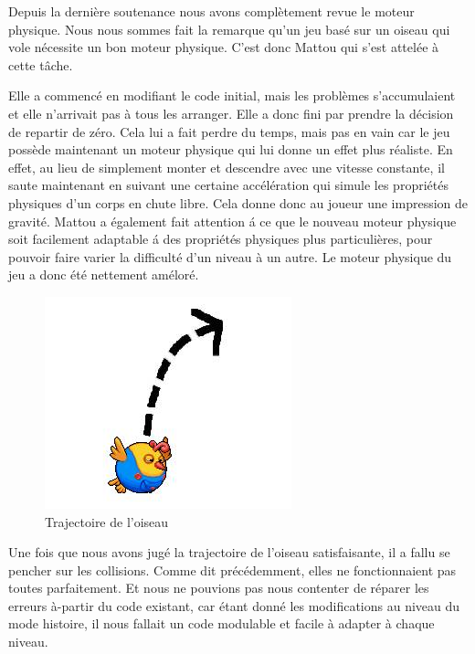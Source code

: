 \documentclass [11pt]{report}
\begin{document}
		Depuis la dernière soutenance nous avons complètement revue le moteur physique. Nous nous sommes fait la remarque qu'un jeu bas\'e sur un oiseau qui vole nécessite un bon moteur physique. C'est donc Mattou qui s'est attelée \`a cette t\^ache. \\
		
		\vspace{6mm}
		
		Elle a commencé en modifiant le code initial, mais les problèmes s'accumulaient et elle n'arrivait pas \`a tous les arranger. Elle a donc fini par prendre la décision de repartir de zéro. Cela lui a fait perdre du temps, mais pas en vain car le jeu possède maintenant un moteur physique qui lui donne un effet plus r\'ealiste. En effet, au lieu de simplement monter et descendre avec une vitesse constante, il saute maintenant en suivant une certaine accélération qui simule les propri\'et\'es physiques d'un corps en chute libre. Cela donne donc au joueur une impression de gravit\'e. Mattou a \'egalement fait attention \'a ce que le nouveau moteur physique soit facilement adaptable \'a des propri\'et\'es physiques plus particulières, pour pouvoir faire varier la difficult\'e d'un niveau \`a un autre. Le moteur physique du jeu a donc \'et\'e nettement am\'elor\'e. \\
				
		\vspace{3mm}
				
		\begin{figure}[h]
			\centering
			\includegraphics[width=0.4\linewidth]{images/trajectoire.jpg}
			\caption[Editeur de Maps]{Trajectoire de l'oiseau}
			\label{fig:Editeur}
		\end{figure}
	
		
		\vspace{8mm}
		
		
		
		\indent Une fois que nous avons jugé la trajectoire de l'oiseau satisfaisante, il a fallu se pencher sur les collisions. Comme dit précédemment, elles ne fonctionnaient pas toutes parfaitement. Et nous ne pouvions pas nous contenter de réparer les erreurs à-partir du code existant, car étant donné les modifications au niveau du mode histoire, il nous fallait un code modulable et facile à adapter à chaque niveau.\\
		
\end{document}
